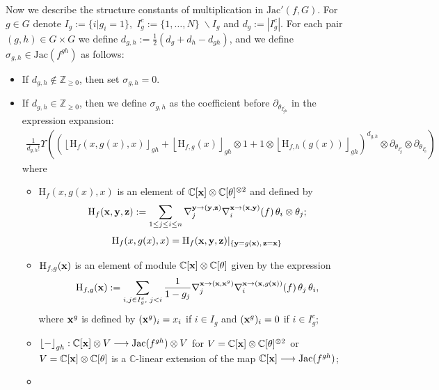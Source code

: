 \documentclass[reqno,12pt]{amsart}
\numberwithin{equation}{section}
\theoremstyle{plain}
\theoremstyle{definition}
\newcommand{\CC}{{\mathbb{C}}}
\newcommand{\ZZ}{{\mathbb{Z}}}
\newcommand{\Jac}{\mathrm{Jac}}
\newcommand{\bx}{{\bf x}}
\newcommand{\by}{{\bf y}}
\newcommand{\bz}{{\bf z}}
\newcommand{\rmH}{{{\rm H}}}
\begin{document}
Now we describe the structure constants of multiplication in $\Jac'(f,G)$. For $g \in G$ denote $I_g := \{i | g_i = 1 \}, \; I_g^c := \{1,\dots, N\} \; \backslash I_g$ and $d_g := |I_g^c|$. For each pair $(g,h) \in G\times G$ we define $d_{g,h}:=\frac{1}{2}(d_g +d_h - d_{gh})$, and we define $\sigma_{g,h}\in \Jac(f^{gh})$ as follows:
\begin{itemize}
\item
If $d_{g,h} \notin \ZZ_{\geq 0}$, then set $\sigma_{g,h} = 0$.
\item
If $d_{g,h} \in \ZZ_{\geq 0}$, then we define $\sigma_{g,h}$ as the coefficient before $\partial_{\theta_{I_{gh}^c}}$ in the expression expansion:
\begin{align*}
\frac{1}{d_{g, h} !} \Upsilon\left(\left(\left\lfloor\mathrm{H}_{f}(x, g(x), x)\right\rfloor_{g h}+\left\lfloor\mathrm{H}_{f, g}(x)\right\rfloor_{g h} \otimes 1+1 \otimes\left\lfloor\mathrm{H}_{f, h}(g(x))\right\rfloor_{g h}\right)^{d_{g, h}} \otimes \partial_{\theta_{I_{g}^c}} \otimes \partial_{\theta_{I_{h}^c}}\right)    
\end{align*}
where 
\begin{itemize}
\item[(1)] $\mathrm{H}_{f}(x, g(x), x)$ is an element of $\CC[\bx]\otimes\CC[\theta]^{\otimes2}$ and defined by
\begin{align*}
\rmH_{f}(\bx,\by,\bz):=\sum_{1\leq j\leq i\leq n} \nabla^{\by\to(\by,\bz)}_j\nabla^{\bx\to(\bx,\by)}_i(f)\,\theta_i\otimes \theta_j;
\end{align*}
\begin{align*}
\mathrm{H}_{f}(x, g(x), x) = \rmH_{f}(\bx,\by,\bz)|_{\{\by=g(\bx),\, \bz=\bx\}}
\end{align*}
\item[(2)]
$\rmH_{{f,g}}(\bx)$ is an element of module $\CC[\bx]\otimes \CC[\theta]$ given by the expression
\begin{eqnarray*}
\rmH_{{f,g}}(\bx):=\sum_{{i,j\in I_{g}^c,\,\,  j<i}}\frac{1}{1-g_j}\nabla^{\bx\to(\bx,\bx^g)}_j\nabla^{\bx\to(\bx,g(\bx))}_i(f)\,\theta_j\,\theta_i,
\end{eqnarray*}
where $\bx^g$ is defined by $(\bx^g)_i=x_i$ if $i\in I_g$ and $(\bx^g)_i=0$ if $i\in I_g^c$;
\item[(3)]
$\left\lfloor\rm- \right\rfloor_{gh}:\CC[\bx]\otimes V\longrightarrow \Jac(f^{gh})\otimes V$ for 
$V=\CC[\bx]\otimes \CC[\theta]^{\otimes 2}$ or $V=\CC[\bx]\otimes \CC[\theta]$
is a $\CC$-linear extension of the map  $\CC[\bx]\longrightarrow \Jac(f^{gh})$;
\item[(4)]

\end{itemize}
\end{itemize}
\end{document}
